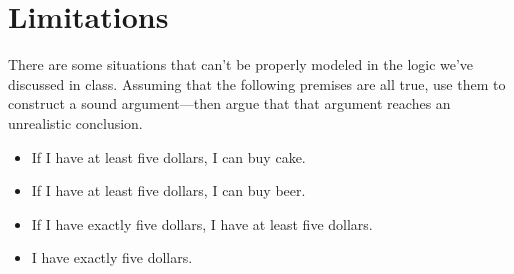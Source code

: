 \documentclass{article}
\begin{document}
\section{Limitations}

There are some situations that can't be properly modeled in the logic we've discussed in class.
Assuming that the following premises are all true, use them to construct a sound argument---then argue that that argument reaches an unrealistic conclusion.

\begin{itemize}
    \setlength{\itemsep}{0pt}
    \item If I have at least five dollars, I can buy cake.
    \item If I have at least five dollars, I can buy beer.
    \item If I have exactly five dollars, I have at least five dollars.
    \item I have exactly five dollars.
\end{itemize}
\end{document}
